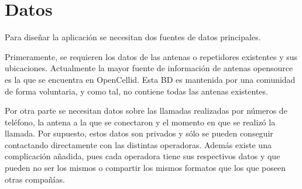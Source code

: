   \section{Datos}
    Para diseñar la aplicación se necesitan dos fuentes de datos principales.
    
    Primeramente, se requieren los datos de las antenas o repetidores existentes y sus ubicaciones. Actualmente la mayor fuente de información de antenas opensource es la que se encuentra en OpenCellid\cite{opencellid}. Esta BD es mantenida por una comunidad de forma voluntaria, y como tal, no contiene todas las antenas existentes.
    
    Por otra parte se necesitan datos sobre las llamadas realizadas por números de teléfono, la antena a la que se conectaron y el momento en que se realizó la llamada. Por supuesto, estos datos son privados y sólo se pueden conseguir contactando directamente con las distintas operadoras. Además existe una complicación añadida, pues cada operadora tiene sus respectivos datos y que pueden no ser los mismos o compartir los mismos formatos que los que poseen otras compañías.